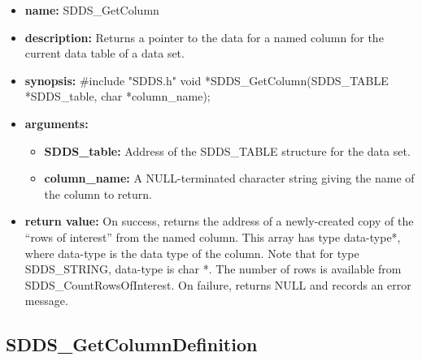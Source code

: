\documentclass[11pt]{article}
\begin{document}
\begin{itemize}
\item {\bf name:}\newline
SDDS\_GetColumn
\item {\bf description:}\newline
Returns a pointer to the data for a named column for the current data table of a data set.
\item {\bf synopsis:} \#include "SDDS.h"\newline
void *SDDS\_GetColumn(SDDS\_TABLE *SDDS\_table, char *column\_name);
\item {\bf arguments:}
\begin{itemize}
\item {\bf SDDS\_table:} Address of the SDDS\_TABLE structure for the data set.
\item {\bf column\_name:} A NULL-terminated character string giving the name of the column to return.
\end{itemize}
\item {\bf return value:}\newline
On success, returns the address of a newly-created copy of the ``rows of interest'' from the named column. This array has type  data-type*, where  data-type is the data type of the column. Note that for type SDDS\_STRING,  data-type is char *. The number of rows is available from SDDS\_CountRowsOfInterest.\newline
\newline
On failure, returns NULL and records an error message. 
\end{itemize}

\subsection{SDDS\_GetColumnDefinition}
\label{SDDS_GetColumnDefinition}
\end{document}
